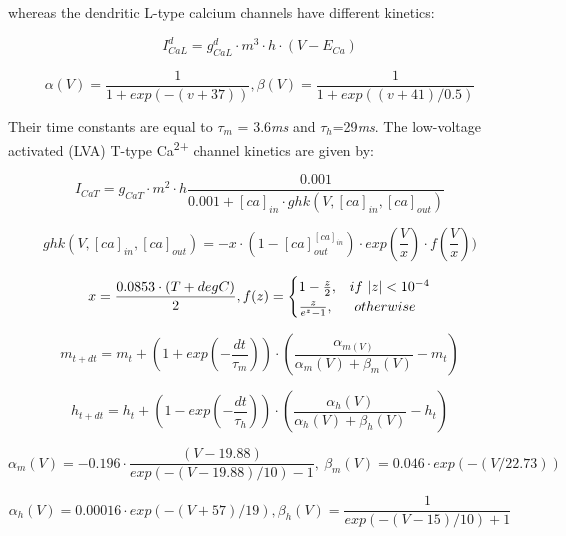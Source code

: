\documentclass[12pt]{article}
\begin{document}
whereas the dendritic L-type calcium channels have different kinetics: 


\begin{equation}
I_{CaL}^d= g_{CaL}^d \cdot m^3 \cdot h \cdot
(V-E_{Ca})
\end{equation}

\begin{equation}
\alpha(V)=\frac {1}{1+exp(-(v+37))},\beta(V)=\frac {1}{1+exp( (v+41)/0.5)}
\end{equation}

Their time constants are equal to $\tau_m$ = 3.6\textit{ms} and $\tau_h$=29\textit{ms}.
The low-voltage activated (LVA) T-type Ca\textsuperscript{2+} channel kinetics are given by:


\begin{equation}
I_{CaT}= g_{CaT}\cdot m^2\cdot
h\frac{0.001 }{0.001+[ca]_{in}\cdot
	ghk(V,[ca]_{in},[ca]_{out})}
\end{equation}

\begin{equation}
ghk(V, [ca]_{in}, [ca]_{out})=-x\cdot
(1 - [ca]_{out}^{[ca]_{in}})\cdot
exp(\frac {V}{x})\cdot f(\frac {V}{x}))
\end{equation}

\begin{equation}
x=\frac{0.0853\cdot (T+degC)}{2}, \\
f(z) = \begin{cases} 1-\frac {z}{2}, & if \ |z|<10^{-4} \\ \frac z{e^z-1}, & \  otherwise \ \end{cases}
\end{equation}

\begin{equation}
m_{t+dt}=m_t+(1+exp(-\frac{dt}{\tau_m}))\cdot
(\frac{\alpha_{m(V)}}{\alpha_m(V)+\beta_m(V)}-m_t)
\end{equation}

\begin{equation}
h_{t+dt}=h_t+(1-exp(-\frac{dt}{\tau_h}))\cdot
(\frac{\alpha_h(V)}{\alpha_h(V)+\beta_h(V)}-h_t)
\end{equation}

\begin{equation}
\alpha_m(V)=-0.196\cdot \frac{(V-19.88)}{exp(-(V-19.88)/10)-1}, \ \beta_m(V) = 0.046\cdot exp(-(V/22.73))
\end{equation}

\begin{equation}
\alpha_h(V)=0.00016\cdot exp(-(V+57)/19),\beta_h(V)=\frac 1{exp(-(V-15)/10)+1}
\end{equation}
\end{document}
